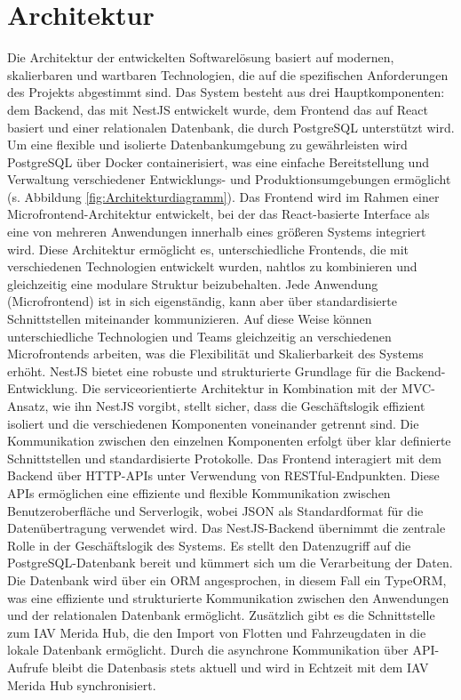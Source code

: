 \section{Architektur}
Die Architektur der entwickelten Softwarelösung basiert auf modernen, skalierbaren und wartbaren Technologien, die auf die spezifischen Anforderungen des Projekts abgestimmt sind. Das System besteht aus drei Hauptkomponenten: dem Backend, das mit NestJS entwickelt wurde, dem Frontend das auf React basiert und einer relationalen Datenbank, die durch PostgreSQL unterstützt wird. Um eine flexible und isolierte Datenbankumgebung zu gewährleisten wird PostgreSQL über Docker containerisiert, was eine einfache Bereitstellung und Verwaltung verschiedener Entwicklungs- und Produktionsumgebungen ermöglicht (s. Abbildung \ref{fig:Architekturdiagramm}). 
\newline
\newline
Das Frontend wird im Rahmen einer Microfrontend-Architektur entwickelt, bei der das React-basierte Interface als eine von mehreren Anwendungen innerhalb eines größeren Systems integriert wird. Diese Architektur ermöglicht es, unterschiedliche Frontends, die mit verschiedenen Technologien entwickelt wurden, nahtlos zu kombinieren und gleichzeitig eine modulare Struktur beizubehalten. Jede Anwendung (Microfrontend) ist in sich eigenständig, kann aber über standardisierte Schnittstellen miteinander kommunizieren. Auf diese Weise können unterschiedliche Technologien und Teams gleichzeitig an verschiedenen Microfrontends arbeiten, was die Flexibilität und Skalierbarkeit des Systems erhöht.
\newline
\newline
NestJS bietet eine robuste und strukturierte Grundlage für die Backend-Entwicklung. Die serviceorientierte Architektur in Kombination mit der \ac{MVC}-Ansatz, wie ihn NestJS vorgibt, stellt sicher, dass die Geschäftslogik effizient isoliert und die verschiedenen Komponenten voneinander getrennt sind.
\newline
Die Kommunikation zwischen den einzelnen Komponenten erfolgt über klar definierte Schnittstellen und standardisierte Protokolle. Das Frontend interagiert mit dem Backend über HTTP-APIs unter Verwendung von RESTful-Endpunkten. Diese APIs ermöglichen eine effiziente und flexible Kommunikation zwischen Benutzeroberfläche und Serverlogik, wobei JSON als Standardformat für die Datenübertragung verwendet wird.
\newline
Das NestJS-Backend übernimmt die zentrale Rolle in der Geschäftslogik des Systems. Es stellt den Datenzugriff auf die PostgreSQL-Datenbank bereit und kümmert sich um die Verarbeitung der Daten. Die Datenbank wird über ein \ac{ORM} angesprochen, in diesem Fall ein TypeORM, was eine effiziente und strukturierte Kommunikation zwischen den Anwendungen und der relationalen Datenbank ermöglicht. Zusätzlich gibt es die Schnittstelle zum IAV Merida Hub, die den Import von Flotten und Fahrzeugdaten in die lokale Datenbank ermöglicht. Durch die asynchrone Kommunikation über API-Aufrufe bleibt die Datenbasis stets aktuell und wird in Echtzeit mit dem IAV Merida Hub synchronisiert.
